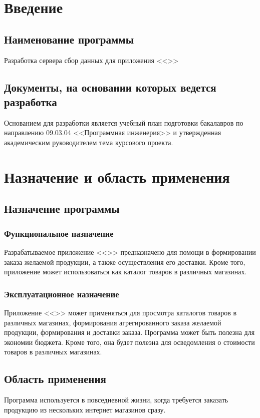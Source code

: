 \documentclass[a4paper,12pt]{article}
\begin{document}
  \CRTsign
  \CRTpreamble

  \section{Введение}
  \subsection{Наименование программы}
  Разработка сервера сбор данных для приложения <<\CRTname>>

  \subsection{Документы, на основании которых ведется разработка}
  Основанием для разработки является учебный план подготовки бакалавров по направлению 09.03.04 <<Программная инженерия>> и утвержденная академическим руководителем тема курсового проекта.

  \newpage
  \section{Назначение и область применения}
  \subsection{Назначение программы}
  \subsubsection{Функциональное назначение}
  Разрабатываемое приложение <<\CRTname>> предназначено для помощи в формировании заказа желаемой продукции, а также осуществления его доставки.
  Кроме того, приложение может использоваться как каталог товаров в различных магазинах.
  \subsubsection{Эксплуатационное назначение}
  Приложение <<\CRTname>> может применяться для просмотра каталогов товаров в различных магазинах,
  формирования агрегированного заказа желаемой продукции, формирования и доставки заказа.
  Программа может быть полезна для экономии бюджета.
  Кроме того, она будет полезна для осведомления о стоимости товаров в различных магазинах.
  \subsection{Область применения}
  Программа используется в повседневной жизни, когда требуется заказать продукцию из нескольких интернет магазинов сразу.
\end{document}
